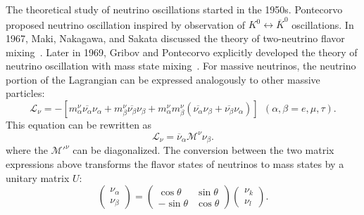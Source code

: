     The theoretical study of neutrino oscillations started in the 1950s.
    Pontecorvo~\cite{bib:Pontecorvo1957, bib:Pontecorvo1957qd} proposed neutrino oscillation inspired by observation of $K^0 \leftrightarrow \overline{K}^0$ oscillations.
    In 1967, Maki, Nakagawa, and Sakata discussed the theory of two-neutrino flavor mixing~\cite{bib:Maki1962}.
    Later in 1969, Gribov and Pontecorvo explicitly developed the theory of neutrino oscillation with mass state mixing~\cite{bib:GRIBOV1969}. 
    For massive neutrinos, the neutrino portion of the Lagrangian can be expressed analogously to other massive particles:
\begin{equation}
\label{eq13}
\mathscr{L}_\nu = -\left[m^\nu_\alpha\overline{\nu_\alpha}\nu_\alpha + m^\nu_\beta\overline{\nu_\beta}\nu_\beta + m^\nu_\alpha m^\nu_\beta(\overline{\nu_\alpha}\nu_\beta + \overline{\nu_\beta}\nu_\alpha) \right] \   \ (\alpha, \beta = e, \mu, \tau).
\end{equation}
    This equation can be rewritten as
\begin{equation}
\label{eq14}
\mathscr{L}_\nu = \overline{\nu}_\alpha\mathcal{M}^\nu\nu_\beta.
\end{equation}
    where the $\mathcal{M}'^\nu$ can be diagonalized. 
    The conversion between the two matrix expressions above transforms the flavor states of neutrinos to mass states by a unitary matrix $U$:
\begin{equation}\label{eq15}
\left(\begin{array}{c}
\nu_\alpha \\
\nu_\beta
\end{array}\right) = \left(\begin{array}{cc}
\cos\theta & \sin\theta \\
-\sin\theta & \cos\theta
\end{array}\right)\left(\begin{array}{c}
\nu_k \\
\nu_l
\end{array}\right).
\end{equation}

